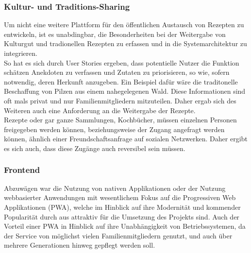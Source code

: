\documentclass[10pt]{article}
\begin{document}
            \subsubsection{Kultur- und Traditions-Sharing}\label{sec:cultureandtradition}
            Um nicht eine weitere Plattform für den öffentlichen Austausch von Rezepten zu entwickeln, ist es unabdingbar, die Besonderheiten bei der Weitergabe von Kulturgut und tradionellen Rezepten zu erfassen und in die Systemarchitektur zu integrieren.\\
            So hat es sich durch User Stories ergeben, dass potentielle Nutzer die Funktion schätzen Anekdoten zu verfassen und Zutaten zu priorisieren, so wie, sofern notwendig, deren Herkunft anzugeben. Ein Beispiel dafür wäre die traditonelle Beschaffung von Pilzen aus einem nahegelegenen Wald. Diese Informationen sind oft mals privat und nur Familienmitgliedern mitzuteilen. Daher ergab sich des Weiteren auch eine Anforderung an die Weitergabe der Rezepte. \\
            Rezepte oder gar ganze Sammlungen, Kochbücher, müssen einzelnen Personen freigegeben werden können, beziehungsweise der Zugang angefragt werden können, ähnlich einer Freundschaftsanfrage auf sozialen Netzwerken. Daher ergibt es sich auch, dass diese Zugänge auch reversibel sein müssen.

            \subsubsection{Frontend}\label{sec:frontend}
            Abzuwägen war die Nutzung von nativen Applikationen\cite{netformic2020} oder der Nutzung webbasierter Anwendungen mit wesentlichem Fokus auf die Progressiven Web Applikationen (PWA), welche im Hinblick auf ihre Modernität und kommender Popularität\cite{netformic2020} durch aus attraktiv für die Umsetzung des Projekts sind. Auch der Vorteil einer PWA in Hinblick auf ihre Unabhängigkeit von Betriebssystemen, da der Service von möglichst vielen Familienmitgliedern genutzt, und auch über mehrere Generationen hinweg gepflegt werden soll.\cite{netformic2020} 
\end{document}
